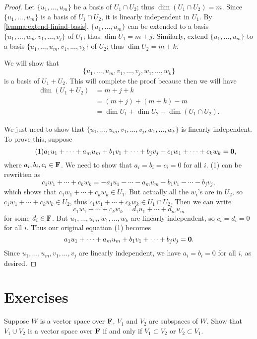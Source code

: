 \begin{proof}
Let $\{u_1,\dots,u_m\}$ be a basis of $U_1\cap U_2$; thus $\dim(U_1\cap U_2)=m$. Since $\{u_1,\dots,u_m\}$ is a basis of $U_1\cap U_2$, it is linearly independent in $U_1$. By \cref{lemma:extend-linind-basis}, $\{u_1,\dots,u_m\}$ can be extended to a basis $\{u_1,\dots,u_m,v_1,\dots,v_j\}$ of $U_1$; thus $\dim U_1=m+j$. Similarly, extend $\{u_1,\dots,u_m\}$ to a basis $\{u_1,\dots,u_m,v_1,\dots,v_k\}$ of $U_2$; thus $\dim U_2=m+k$.

We will show that
\[\{u_1,\dots,u_m,v_1,\dots,v_j,w_1,\dots,w_k\}\]
is a basis of $U_1+U_2$. This will complete the proof because then we will have
\begin{align*}
\dim(U_1+U_2)&=m+j+k\\
&=(m+j)+(m+k)-m\\
&=\dim U_1+\dim U_2-\dim(U_1\cap U_2).
\end{align*}

We just need to show that $\{u_1,\dots,u_m,v_1,\dots,v_j,w_1,\dots,w_k\}$ is linearly independent. To prove this, suppose
\begin{equation*}\tag{1}
a_1u_1+\cdots+a_mu_m+b_1v_1+\cdots+b_jv_j+c_1w_1+\cdots+c_kw_k=\vb{0},
\end{equation*}
where $a_i,b_i,c_i\in\mathbf F$. We need to show that $a_i=b_i=c_i=0$ for all $i$. (1) can be rewritten as
\[c_1w_1+\cdots+c_kw_k=-a_1u_1-\cdots-a_mu_m-b_1v_1-\cdots-b_jv_j,\]
which shows that $c_1w_1+\cdots+c_kw_k\in U_1$. But actually all the $w_i$'s are in $U_2$, so $c_1w_1+\cdots+c_kw_k\in U_2$, thus $c_1w_1+\cdots+c_kw_k\in U_1\cap U_2$. Then we can write
\[c_1w_1+\cdots+c_kw_k=d_1u_1+\cdots+d_mu_m\]
for some $d_i\in\mathbf F$. But $u_1,\dots,u_m,w_1,\dots,w_k$ are linearly independent, so $c_i=d_i=0$ for all $i$. Thus our original equation (1) becomes
\[a_1u_1+\cdots+a_mu_m+b_1v_1+\cdots+b_jv_j=\vb{0}.\]
Since $u_1,\dots,u_m,v_1,\dots,v_j$ are linearly independent, we have $a_i=b_i=0$ for all $i$, as desired.
\end{proof}
\pagebreak

\section*{Exercises}
\begin{prbm}
Suppose $W$ is a vector space over $\mathbf F$, $V_1$ and $V_2$ are subspaces of $W$. Show that $V_1\cup V_2$ is a vector space over $\mathbf F$ if and only if $V_1\subset V_2$ or $V_2\subset V_1$.
\end{prbm}

